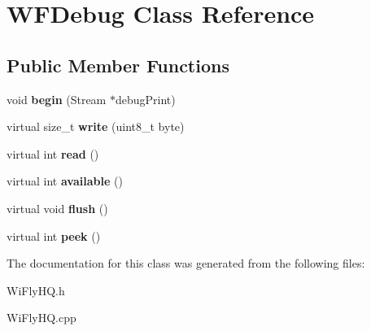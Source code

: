 \hypertarget{class_w_f_debug}{
\section{\-W\-F\-Debug \-Class \-Reference}
\label{class_w_f_debug}
}
\subsection*{\-Public \-Member \-Functions}
\begin{DoxyCompactItemize}
\item 
\hypertarget{class_w_f_debug_ae5d688acbf31633838b071e2de9d4b88}{
void {\bfseries begin} (\-Stream $\ast$debug\-Print)}
\label{class_w_f_debug_ae5d688acbf31633838b071e2de9d4b88}

\item 
\hypertarget{class_w_f_debug_a968e3dcca6c36aea50e3dad51ac9d361}{
virtual size\-\_\-t {\bfseries write} (uint8\-\_\-t byte)}
\label{class_w_f_debug_a968e3dcca6c36aea50e3dad51ac9d361}

\item 
\hypertarget{class_w_f_debug_a60f74dfa2f1f5f87e636a80517a1af83}{
virtual int {\bfseries read} ()}
\label{class_w_f_debug_a60f74dfa2f1f5f87e636a80517a1af83}

\item 
\hypertarget{class_w_f_debug_a676c153e93fffb7f9116bf918cc0886f}{
virtual int {\bfseries available} ()}
\label{class_w_f_debug_a676c153e93fffb7f9116bf918cc0886f}

\item 
\hypertarget{class_w_f_debug_a62a099d2bd56c40753f7b08a1e5151e3}{
virtual void {\bfseries flush} ()}
\label{class_w_f_debug_a62a099d2bd56c40753f7b08a1e5151e3}

\item 
\hypertarget{class_w_f_debug_a6c5213cc1bb89bd2e5cf8a6eecc316c6}{
virtual int {\bfseries peek} ()}
\label{class_w_f_debug_a6c5213cc1bb89bd2e5cf8a6eecc316c6}

\end{DoxyCompactItemize}


\-The documentation for this class was generated from the following files\-:\begin{DoxyCompactItemize}
\item 
\-Wi\-Fly\-H\-Q.\-h\item 
\-Wi\-Fly\-H\-Q.\-cpp\end{DoxyCompactItemize}
